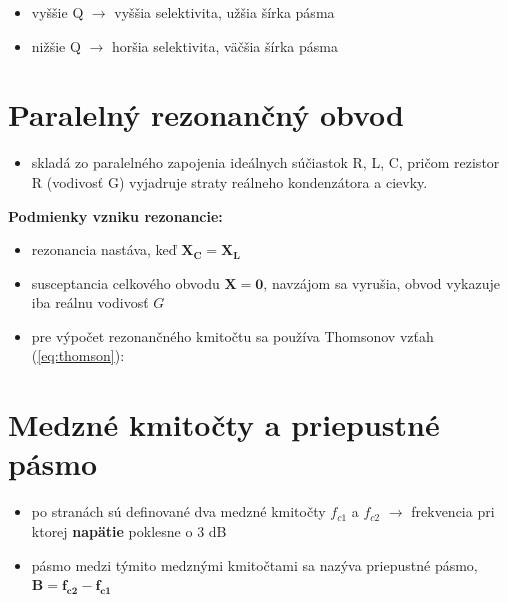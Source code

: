 	{\raggedright 	%
	\begin{itemize}[label = $\rightarrow$]
		\item vyššie Q $\rightarrow$ vyššia selektivita, užšia šírka pásma
		\item nižšie Q $\rightarrow$ horšia selektivita, väčšia šírka pásma
	\end{itemize}
	
		\section{Paralelný rezonančný obvod}
	\begin{itemize}[label=--]
		\item skladá zo paralelného zapojenia ideálnych súčiastok R, L, C, pričom rezistor R (vodivosť G) vyjadruje straty reálneho kondenzátora a cievky.
	\end{itemize}
		{\raggedright\textbf{Podmienky vzniku rezonancie:}}
	\begin{itemize}[label=--]
		\item rezonancia nastáva, keď $\mathbf{X_C = X_L}$
		\item susceptancia celkového obvodu $\mathbf{X = 0}$, navzájom sa vyrušia, obvod vykazuje iba reálnu vodivosť $G$
		\item pre výpočet rezonančného kmitočtu sa používa Thomsonov vzťah (\ref{eq:thomson}):
	\end{itemize}
	
	\section{Medzné kmitočty a priepustné pásmo}
	\begin{itemize}[label=--]
		\item po stranách sú definované dva medzné kmitočty $f_{c1}$ a $f_{c2}$ $\rightarrow$ frekvencia pri ktorej \textbf{napätie} poklesne o 3 dB
		\item pásmo medzi týmito medznými kmitočtami sa nazýva priepustné pásmo, $\mathbf{B = f_{c2}-f_{c1}}$
	\end{itemize}
	
}

